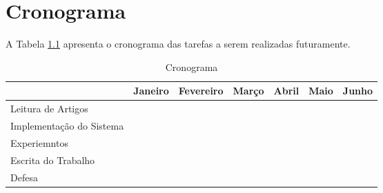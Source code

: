 \chapter{Cronograma}

A Tabela \ref{tabela:cronograma} apresenta o cronograma das tarefas a serem realizadas futuramente.

\begin{table}[h]
	\captionsetup{justification=centering}
	\caption{Cronograma}
	\label{tabela:cronograma}
	\begin{tabular}{|l|l|l|l|l|l|l|}
		\hline
		& Janeiro & Fevereiro & Março & Abril & Maio & Junho \\ \hline
		Leitura de Artigos       &         &           &       &       &      &       \\ \hline
		Implementação do Sistema &         &           &       &       &      &       \\ \hline
		Experiemntos             &         &           &       &       &      &       \\ \hline
		Escrita do Trabalho      &         &           &       &       &      &       \\ \hline
		Defesa                   &         &           &       &       &      &       \\ \hline
	\end{tabular}
\end{table}